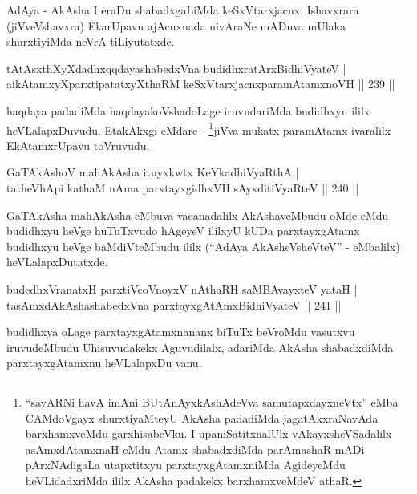 \begin{artha}
AdAya - AkAsha I eraDu shabadxgaLiMda keSxVtarxjacnx, Ishavxrara (jiVveVshavxra) EkarUpavu ajAcnxnada nivAraNe mADuva mUlaka shurxtiyiMda neVrA tiLiyutatxde.
\end{artha}

\begin{shl}
tAtAsxthXyXdadhxqqdayashabedxVna budidhxratArxBidhiVyateV |\\
aikAtamxyXparxtipatatxyXthaRM keSxVtarxjacnxparamAtamxnoVH \hfill || 239 ||
\end{shl}

\begin{artha}
haqdaya padadiMda haqdayakoVshadoLage iruvudariMda budidhxyu ililx 
heVLalapxDuvudu. EtakAkxgi eMdare - \footnote{``savARNi havA imAni BUtAnAyxkAshAdeVva samutapxdayxneVtx'' eMba 
CAMdoVgayx shurxtiyaMteyU AkAsha padadiMda jagatAkxraNavAda barxhamxveMdu garxhisabeVku. I upaniSatitxnalUlx vAkayxsheVSadalilx asAmxdAtamxnaH eMdu Atamx shabadxdiMda parAmashaR mADi pArxNAdigaLa utapxtitxyu parxtayxgAtamxniMda AgideyeMdu heVLidadxriMda ililx AkAsha padakekx barxhamxveMdeV athaR.}jiVva-mukatx paramAtamx ivaralilx EkAtamxrUpavu toVruvudu.
\end{artha}

\begin{shl}
GaTAkAshoV mahAkAsha ituyxkwtx KeYkadhiVyaRthA |\\
tatheVhApi kathaM nAma parxtayxgidhxVH sAyxditiVyaRteV \hfill || 240 ||
\end{shl}

\begin{artha}
GaTAkAsha mahAkAsha eMbuva vacanadalilx AkAshaveMbudu oMde eMdu budidhxyu heVge huTuTxvudo hAgeyeV ililxyU kUDa parxtayxgAtamx budidhxyu heVge baMdiVteMbudu ililx (``AdAya AkAsheVsheVteV'' - eMbalilx) heVLalapxDutatxde.
\end{artha}

\begin{shl}
budedhxVranatxH parxtiVcoV\s noyxV nAthaRH saMBAvayxteV yataH |\\
tasAmxdAkAshashabedxVna parxtayxgAtAmx\s BidhiVyateV \hfill || 241 ||
\end{shl}

\begin{artha}
budidhxya oLage parxtayxgAtamxnananx biTuTx beVroMdu vasutxvu iruvudeMbudu Uhisuvudakekx Aguvudilalx, adariMda AkAsha shabadxdiMda parxtayxgAtamxnu heVLalapxDu	vanu.
\end{artha}

